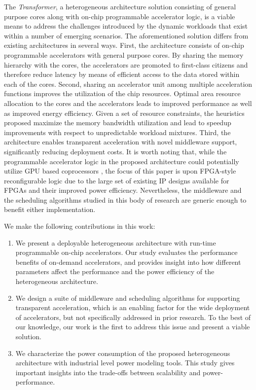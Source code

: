 The {\em Transformer}, a heterogeneous architecture solution consisting of 
general purpose cores along with on-chip programmable accelerator logic, is a
viable means to address the challenges introduced by the dynamic workloads that exist within a number of
emerging scenarios. The aforementioned solution differs from existing architectures in several ways.
First, the architecture consists of on-chip programmable
accelerators with general purpose cores.  By sharing the memory hierarchy
with the cores, the accelerators are promoted to first-class citizens and therefore
reduce latency by means of efficient access to the data stored within each of the cores.  
Second, sharing an accelerator unit among multiple acceleration functions
improves the utilization of the chip resources. Optimal area resource
allocation to the cores and the accelerators leads to improved performance as well as improved
energy efficiency. Given a set of resource constraints, the heuristics proposed maximize the memory
bandwidth utilization and lead to speedup improvements with respect to unpredictable workload
mixtures. Third, the architecture
enables transparent acceleration with novel middleware support,
significantly reducing deployment costs.  It is worth noting that,
while the programmable accelerator logic in the proposed architecture
could potentially utilize GPU based coprocessors \cite{intel-gpu}, the focus of this paper
is upon FPGA-style reconfigurable logic due to the large set of existing IP
designs available for FPGAs and their improved power
efficiency. Nevertheless, the middleware and the scheduling algorithms
studied in this body of research are generic enough to benefit either
implementation.

We make the following contributions in this work:
\begin{enumerate}

\item We present a deployable heterogeneous architecture with run-time
  programmable on-chip accelerators. Our study evaluates the
  performance benefits of on-demand accelerators, and provides insight into how different parameters affect the performance and the power efficiency of the heterogeneous architecture.

\item We design a suite of middleware and scheduling algorithms for
  supporting transparent acceleration, which is an enabling factor for
  the wide deployment of accelerators, but not specifically addressed in
  prior research. To the best of our knowledge, our work is the first
  to address this issue and present a viable solution.

\item We characterize the power consumption of the proposed
  heterogeneous architecture with industrial level power modeling
  tools. This study gives important insights into the trade-offs between scalability and
  power-performance.

\end{enumerate}

